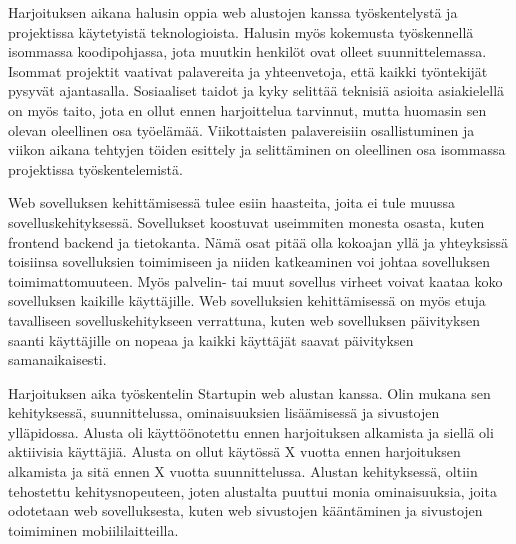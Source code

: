 \documentclass[11pt,a4paper,titlepage,oneside]{article}
\begin{document}
Harjoituksen aikana halusin oppia web alustojen kanssa työskentelystä ja projektissa käytetyistä teknologioista.
%
Halusin myös kokemusta työskennellä isommassa koodipohjassa, jota muutkin henkilöt ovat olleet suunnittelemassa.
Isommat projektit vaativat palavereita ja yhteenvetoja, että kaikki työntekijät pysyvät ajantasalla.
Sosiaaliset taidot ja kyky selittää teknisiä asioita asiakielellä on myös taito, 
jota en ollut ennen harjoittelua tarvinnut, mutta huomasin sen olevan oleellinen osa työelämää.
Viikottaisten palavereisiin osallistuminen ja viikon aikana tehtyjen töiden esittely ja selittäminen on oleellinen osa isommassa projektissa työskentelemistä.
\medskip



Web sovelluksen kehittämisessä tulee esiin haasteita, joita ei tule muussa sovelluskehityksessä.
Sovellukset koostuvat useimmiten monesta osasta, kuten frontend backend ja tietokanta.
Nämä osat pitää olla kokoajan yllä ja yhteyksissä toisiinsa sovelluksien toimimiseen ja niiden katkeaminen voi
johtaa sovelluksen toimimattomuuteen.
% 
Myös palvelin- tai muut sovellus virheet voivat kaataa koko sovelluksen kaikille käyttäjille. 
%
Web sovelluksien kehittämisessä on myös etuja tavalliseen sovelluskehitykseen verrattuna, kuten 
web sovelluksen päivityksen saanti käyttäjille on nopeaa ja kaikki käyttäjät saavat päivityksen samanaikaisesti.
\medskip

Harjoituksen aika työskentelin Startupin web alustan kanssa. 
Olin mukana sen kehityksessä, suunnittelussa, ominaisuuksien lisäämisessä ja sivustojen ylläpidossa.
Alusta oli käyttöönotettu ennen harjoituksen alkamista ja siellä oli aktiivisia käyttäjiä.
Alusta on ollut käytössä X vuotta ennen harjoituksen alkamista ja sitä ennen X vuotta suunnittelussa.
%
Alustan kehityksessä, oltiin tehostettu kehitysnopeuteen,
joten alustalta puuttui monia ominaisuuksia, joita odotetaan web sovelluksesta, 
kuten web sivustojen kääntäminen ja sivustojen toimiminen mobiililaitteilla.
\medskip
\end{document}
